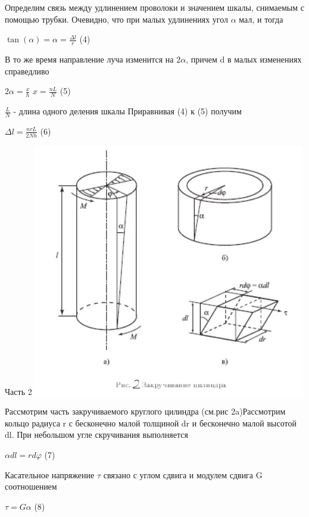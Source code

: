 \documentclass[12pt,a4paper]{article}
\begin{document}
\begin{par}
Определим связь между удлинением проволоки и значением шкалы, снимаемым с помощью трубки. Очевидно, что при малых удлинениях угол $\alpha$ мал, и тогда
\end{par}
\begin{center}
\large $\tan(\alpha)=\alpha=\frac{\Delta{l}}{r}$ (4)
\end{center}
В то же время направление луча изменится на $2\alpha$, причем d в малых изменениях справедливо
\begin{center}
\large $2\alpha=\frac{x}{h}$ \;\;\;\;\;\;\; $x=\frac{nL}{N}$ (5)
\end{center}
$\frac{L}{N}$ - длина одного деления шкалы
\hfill \break
\hfill \break
Приравнивая (4) к (5) получим 
\begin{center}
\large $\Delta{l}=\frac{nrL}{2Nh}$ (6)
\end{center}
\begin{center}
\hfill \break
Часть 2
\break
\includegraphics{1.3.1_1} \break
\end{center}
\par {Рассмотрим часть закручиваемого круглого цилиндра (см.рис 2a)}{Рассмотрим кольцо радиуса r с бесконечно малой толщиной dr и бесконечно малой высотой dl. При небольшом угле скручивания выполняется}
\begin{center}
\large $\alpha{dl}=rd\varphi$ (7)
\end{center}
{Касательное напряжение $\tau$ связано с углом сдвига и модулем сдвига G соотношением}
\begin{center}
\large $\tau=G\alpha$ (8)
\end{center}
\end{document}
